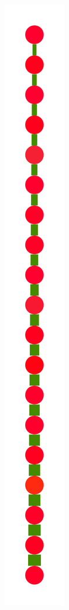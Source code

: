 \documentclass[a4paper,10pt]{article}
\begin{document}
\begin{figure}
{    \includegraphics[scale=.14]{./figures/6-3-recursion-induced-7.pdf}
}
\end{figure}
\end{document}
